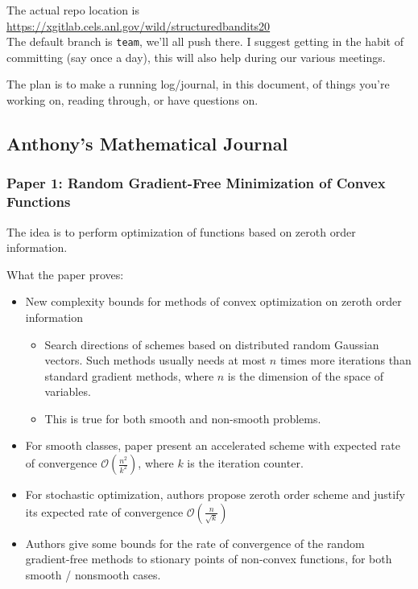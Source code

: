 \documentclass{article}
\begin{document}
The actual repo location is\\
\url{https://xgitlab.cels.anl.gov/wild/structuredbandits20}
\\
The default branch is \texttt{team}, we'll all push there. I suggest getting in the habit of committing (say once a day), this will also help during our various meetings. 

The plan is to make a running log/journal, in this document, of things you're working on, reading through, or have questions on.



\subsection{Anthony's Mathematical Journal}

\subsubsection{Paper 1: Random Gradient-Free Minimization of Convex Functions}

The idea is to perform optimization of functions based on zeroth order information. 

What the paper proves:
\begin{itemize}
    \item New complexity bounds for methods of convex optimization on zeroth order information
    \begin{itemize}
        \item Search directions of schemes based on distributed random Gaussian vectors. Such methods usually needs at most $n$ times more iterations than standard gradient methods, where $n$ is the dimension of the space of variables. 
        \item This is true for both smooth and non-smooth problems. 
    \end{itemize}
    \item For smooth classes, paper present an accelerated scheme with expected rate of convergence $\mathcal{O}\left(\frac{n^2}{k^2}\right)$, where $k$ is the iteration counter.
    \item For stochastic optimization, authors propose zeroth order scheme and justify its expected rate of convergence $\mathcal{O}\left(\frac{n}{\sqrt{k}}\right)$
    \item Authors give some bounds for the rate of convergence of the random gradient-free methods to stionary points of non-convex functions, for both smooth / nonsmooth cases. 
\end{itemize}
\end{document}
